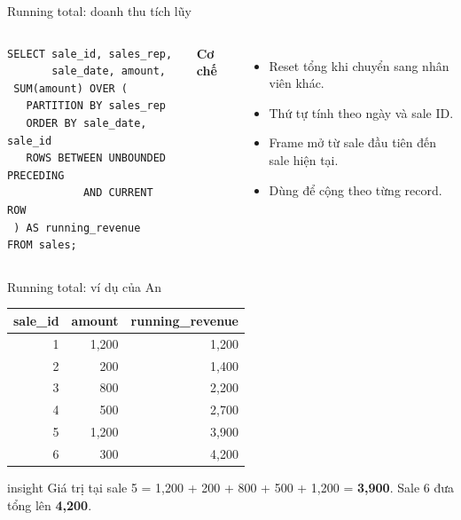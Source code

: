 \documentclass[aspectratio=169,11pt]{beamer}
\newcommand{\code}[1]{{\small\ttfamily\detokenize{#1}}}
\begin{document}
\begin{frame}[fragile]{Running total: doanh thu tích lũy}
\begin{columns}[T,onlytextwidth]
\begin{lstlisting}[basicstyle=\ttfamily\fontsize{8}{9.2}\selectfont]
SELECT sale_id, sales_rep,
       sale_date, amount,
 SUM(amount) OVER (
   PARTITION BY sales_rep
   ORDER BY sale_date, sale_id
   ROWS BETWEEN UNBOUNDED PRECEDING
            AND CURRENT ROW
 ) AS running_revenue
FROM sales;
\end{lstlisting}

\textbf{Cơ chế}
\begin{itemize}
\item Reset tổng khi chuyển sang nhân viên khác.
\item Thứ tự tính theo ngày và sale ID.
\item Frame mở từ sale đầu tiên đến sale hiện tại.
\item Dùng \code{ROWS} để cộng theo từng record.
\end{itemize}

\end{columns}
\end{frame}

\begin{frame}[fragile]{Running total: ví dụ của An}

\begin{center}
\renewcommand{\arraystretch}{1.18}
\begin{tabular}{rrr}
\toprule
sale\_id & amount & running\_revenue \\
\midrule
1 & 1,200 & 1,200 \\
2 & 200 & 1,400 \\
3 & 800 & 2,200 \\
4 & 500 & 2,700 \\
5 & 1,200 & 3,900 \\
6 & 300 & 4,200 \\
\bottomrule
\end{tabular}
\end{center}
\par\vspace{0.4em}
\begin{beamercolorbox}[wd=\linewidth,sep=1.1ex,rounded=true]{insight}
Giá trị tại sale 5 = 1,200 + 200 + 800 + 500 + 1,200 = \textbf{3,900}. Sale 6 đưa tổng lên \textbf{4,200}.
\end{beamercolorbox}
\end{frame}
\end{document}
